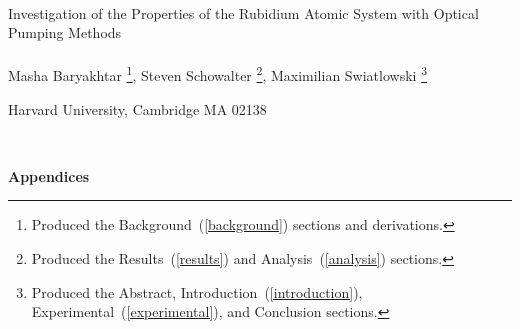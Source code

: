 \documentclass[12pt,notitlepage]{article}
\begin{document}


\begin{titlepage}
\begin{center}

\ \\
\vspace{.5in}

{\Huge Investigation of the Properties of the Rubidium Atomic System with Optical Pumping Methods \\}
\ \\



\large{Masha Baryakhtar \footnote{Produced the Background~(\ref{background}) sections and derivations.}, Steven Schowalter \footnote{Produced the Results~(\ref{results}) and Analysis~(\ref{analysis}) sections.}, Maximilian Swiatlowski \footnote{Produced the Abstract, Introduction~(\ref{introduction}), Experimental~(\ref{experimental}), and Conclusion sections.}}

\small{Harvard University, Cambridge MA 02138}

\ \\




\end{center}
\end{titlepage}

\clearpage














\vspace{1 in}

\appendix



\begin{center}
\begin{Large}
\bfseries{Appendices}
\end{Large}
\end{center}



\newpage


\end{document}
